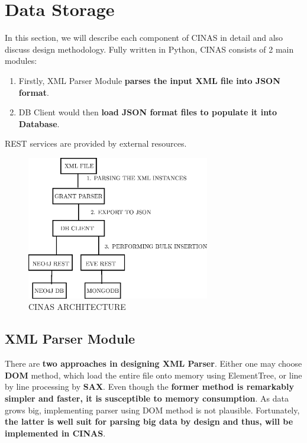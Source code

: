 \documentclass{article}
\begin{document}
\section{Data Storage}
In this section, we will describe each component of CINAS in detail and also discuss design methodology. Fully written in Python, CINAS consists of 2 main modules:
\begin{enumerate}
 \item Firstly, XML Parser Module \textbf{parses the input XML file into JSON format}.
 \item DB Client would then \textbf{load JSON format files to populate it into Database}.
\end{enumerate}
REST services are provided by external resources.
\begin{figure}[H]
\centering
\includegraphics[width=80mm,scale=0.1]{cinasstruct.eps}
\caption{ CINAS ARCHITECTURE}
\end{figure}
\subsection{XML Parser Module}
There are \textbf{two approaches in designing XML Parser}. Either one may choose \textbf{DOM} method, which load the entire file onto memory using ElementTree, or line by line processing by \textbf{SAX}. Even though the \textbf{former method is remarkably simpler and faster, it is susceptible to memory consumption}. As data grows big, implementing parser using DOM method is not plausible. Fortunately, \textbf{the latter is well suit for parsing big data by design and thus, will be implemented in CINAS}.
\end{document}
